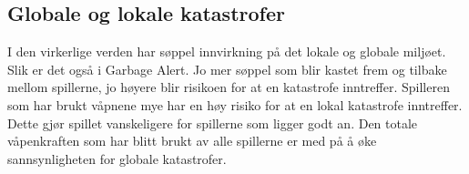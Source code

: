

\subsection{Globale og lokale katastrofer}\label{sec:hazards}

I den virkerlige verden har søppel innvirkning på det lokale og globale miljøet. Slik er det også i Garbage Alert. Jo mer søppel som blir kastet frem og tilbake mellom spillerne, jo høyere blir risikoen for at en katastrofe inntreffer. Spilleren som har brukt våpnene mye har en høy risiko for at en lokal katastrofe inntreffer. Dette gjør spillet vanskeligere for spillerne som ligger godt an. Den totale våpenkraften som har blitt brukt av alle spillerne er med på å øke sannsynligheten for globale katastrofer.

